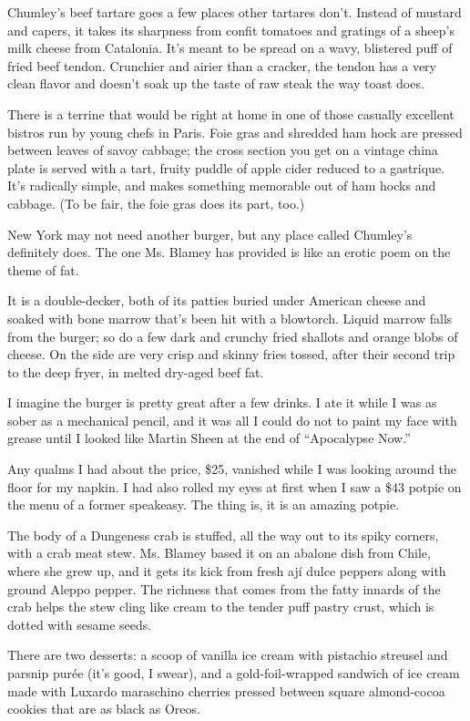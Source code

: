 Chumley's beef tartare goes a few places other tartares don't. Instead
of mustard and capers, it takes its sharpness from confit tomatoes and
gratings of a sheep's milk cheese from Catalonia. It's meant to be
spread on a wavy, blistered puff of fried beef tendon. Crunchier and
airier than a cracker, the tendon has a very clean flavor and doesn't
soak up the taste of raw steak the way toast does.

There is a terrine that would be right at home in one of those casually
excellent bistros run by young chefs in Paris. Foie gras and shredded
ham hock are pressed between leaves of savoy cabbage; the cross section
you get on a vintage china plate is served with a tart, fruity puddle of
apple cider reduced to a gastrique. It's radically simple, and makes
something memorable out of ham hocks and cabbage. (To be fair, the foie
gras does its part, too.)

New York may not need another burger, but any place called Chumley's
definitely does. The one Ms. Blamey has provided is like an erotic poem
on the theme of fat.

It is a double-decker, both of its patties buried under American cheese
and soaked with bone marrow that's been hit with a blowtorch. Liquid
marrow falls from the burger; so do a few dark and crunchy fried
shallots and orange blobs of cheese. On the side are very crisp and
skinny fries tossed, after their second trip to the deep fryer, in
melted dry-aged beef fat.

I imagine the burger is pretty great after a few drinks. I ate it while
I was as sober as a mechanical pencil, and it was all I could do not to
paint my face with grease until I looked like Martin Sheen at the end of
``Apocalypse Now.''

Any qualms I had about the price, \$25, vanished while I was looking
around the floor for my napkin. I had also rolled my eyes at first when
I saw a \$43 potpie on the menu of a former speakeasy. The thing is, it
is an amazing potpie.

The body of a Dungeness crab is stuffed, all the way out to its spiky
corners, with a crab meat stew. Ms. Blamey based it on an abalone dish
from Chile, where she grew up, and it gets its kick from fresh ají dulce
peppers along with ground Aleppo pepper. The richness that comes from
the fatty innards of the crab helps the stew cling like cream to the
tender puff pastry crust, which is dotted with sesame seeds.

There are two desserts: a scoop of vanilla ice cream with pistachio
streusel and parsnip purée (it's good, I swear), and a gold-foil-wrapped
sandwich of ice cream made with Luxardo maraschino cherries pressed
between square almond-cocoa cookies that are as black as Oreos.

